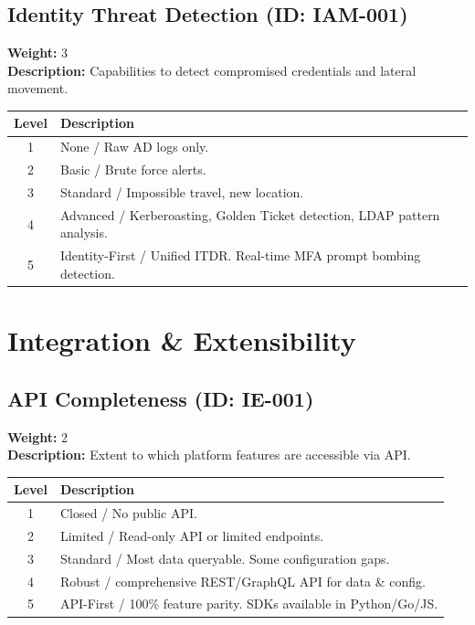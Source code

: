 \documentclass{article}
\begin{document}
\subsection{Identity Threat Detection (ID: IAM-001)}
\textbf{Weight:} 3 \\
\textbf{Description:} Capabilities to detect compromised credentials and lateral movement.
\vspace{0.3cm}
\begin{longtable}{|c|p{12cm}|}
\hline
\rowcolor{lightgray} \textbf{Level} & \textbf{Description} \\ \hline
1 & None / Raw AD logs only. \\ \hline
2 & Basic / Brute force alerts. \\ \hline
3 & Standard / Impossible travel, new location. \\ \hline
4 & Advanced / Kerberoasting, Golden Ticket detection, LDAP pattern analysis. \\ \hline
5 & Identity-First / Unified ITDR. Real-time MFA prompt bombing detection. \\ \hline
\end{longtable}
\vspace{0.5cm}
\section{Integration \& Extensibility}
\subsection{API Completeness (ID: IE-001)}
\textbf{Weight:} 2 \\
\textbf{Description:} Extent to which platform features are accessible via API.
\vspace{0.3cm}
\begin{longtable}{|c|p{12cm}|}
\hline
\rowcolor{lightgray} \textbf{Level} & \textbf{Description} \\ \hline
1 & Closed / No public API. \\ \hline
2 & Limited / Read-only API or limited endpoints. \\ \hline
3 & Standard / Most data queryable. Some configuration gaps. \\ \hline
4 & Robust / comprehensive REST/GraphQL API for data \& config. \\ \hline
5 & API-First / 100\% feature parity. SDKs available in Python/Go/JS. \\ \hline
\end{longtable}
\vspace{0.5cm}
\end{document}
